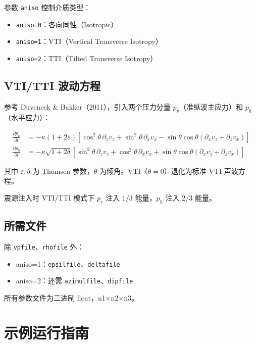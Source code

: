 \documentclass[11pt,a4paper]{ctexart}
\begin{document}
参数 \texttt{aniso} 控制介质类型：

\begin{itemize}
  \item \texttt{aniso=0}：各向同性（Isotropic）
  \item \texttt{aniso=1}：VTI（Vertical Transverse Isotropy）
  \item \texttt{aniso=2}：TTI（Tilted Transverse Isotropy）
\end{itemize}

\subsection{VTI/TTI 波动方程}

参考 Duveneck \& Bakker（2011），引入两个压力分量 $p_v$（准纵波主应力）和 $p_h$（水平应力）：

\begin{align*}
  \frac{\partial p_v}{\partial t} &=
  -\kappa (1+2\varepsilon) [ \cos^2\theta \,\partial_z v_z + \sin^2\theta \,\partial_x v_x
  - \sin\theta\cos\theta (\partial_x v_z + \partial_z v_x) ] \\
  \frac{\partial p_h}{\partial t} &=
  -\kappa \sqrt{1+2\delta} [ \sin^2\theta \,\partial_z v_z + \cos^2\theta \,\partial_x v_x
  + \sin\theta\cos\theta (\partial_x v_z + \partial_z v_x) ]
\end{align*}

其中 $\varepsilon,\delta$ 为 Thomsen 参数，$\theta$ 为倾角。VTI（$\theta=0$）退化为标准 VTI 声波方程。

震源注入时 VTI/TTI 模式下 $p_v$ 注入 $1/3$ 能量，$p_h$ 注入 $2/3$ 能量。

\subsection{所需文件}

除 \texttt{vpfile}、\texttt{rhofile} 外：
\begin{itemize}
  \item aniso=1：\texttt{epsilfile}、\texttt{deltafile}
  \item aniso=2：还需 \texttt{azimulfile}、\texttt{dipfile}
\end{itemize}

所有参数文件为二进制 float，n1$\times$n2$\times$n3。


\section{示例运行指南}
\end{document}
